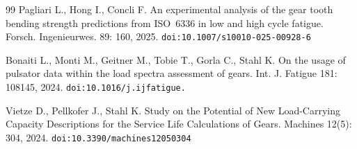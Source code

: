 \documentclass[twocolumn,12pt,a4paper]{article}
\begin{document}
\begin{thebibliography}{99}
Pagliari L., Hong I., Concli F. An experimental analysis of the gear
tooth bending strength predictions from ISO~6336 in low and high cycle
fatigue. Forsch. Ingenieurwes. 89: 160, 2025.
\texttt{doi:10.1007/\allowbreak s10010-025-00928-6}

Bonaiti L., Monti M., Geitner M., Tobie T., Gorla C., Stahl K.
On the usage of pulsator data within the load spectra assessment of
gears. Int. J. Fatigue 181: 108145, 2024.
\texttt{doi:10.1016/\allowbreak j.ijfatigue.}

Vietze D., Pellkofer J., Stahl K. Study on the Potential of New
Load-Carrying Capacity Descriptions for the Service Life Calculations
of Gears. Machines 12(5): 304, 2024.
\texttt{doi:10.3390/machines12050304}

\end{thebibliography}
\end{document}
